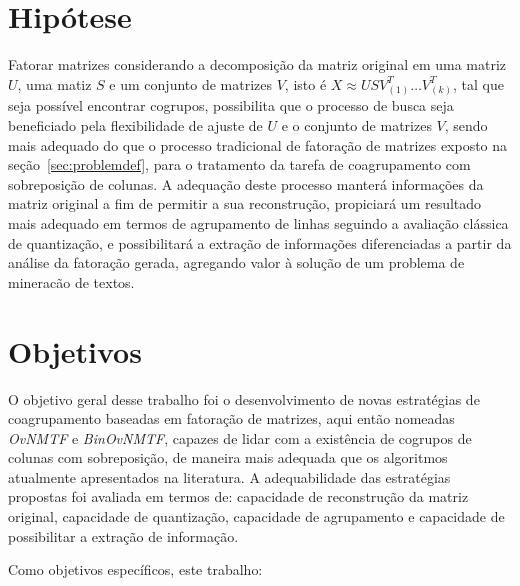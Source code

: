 \documentclass[
    12pt,                %
    oneside,            %
    a4paper,            %
    english,            %
    brazil                %
    ]{abntex2ppgsi}
\begin{document}


\section{Hipótese}

Fatorar matrizes considerando a decomposição da matriz original em uma matriz $U$, uma matiz $S$ e um conjunto de matrizes $V$, isto é $X \approx USV_{(1)}^T \dots V_{(k)}^T$, tal que seja possível encontrar cogrupos, possibilita que o processo de busca seja beneficiado pela flexibilidade de ajuste de $U$ e o conjunto de matrizes $V$, sendo mais adequado do que o processo tradicional de fatoração de matrizes exposto na seção~\ref{sec:problemdef}, para o tratamento da tarefa de coagrupamento com sobreposição de colunas.
A adequação deste processo manterá informações da matriz original a fim de permitir a sua reconstrução, propiciará um resultado mais adequado em termos de agrupamento de linhas seguindo a avaliação clássica de quantização, e possibilitará a extração de informações diferenciadas a partir da análise da fatoração gerada, agregando valor à solução de um problema de mineracão de textos.


\section{Objetivos}

O objetivo geral desse trabalho foi o desenvolvimento de novas estratégias de coagrupamento baseadas em fatoração de matrizes, aqui então nomeadas \textit{OvNMTF} e \textit{BinOvNMTF}, capazes de lidar com a existência de cogrupos de colunas com sobreposição, de maneira mais adequada que os algoritmos atualmente apresentados na literatura.
A adequabilidade das estratégias propostas foi avaliada em termos de: capacidade de reconstrução da matriz original, capacidade de quantização, capacidade de agrupamento e capacidade de possibilitar a extração de informação.

Como objetivos específicos, este trabalho:
\end{document}
